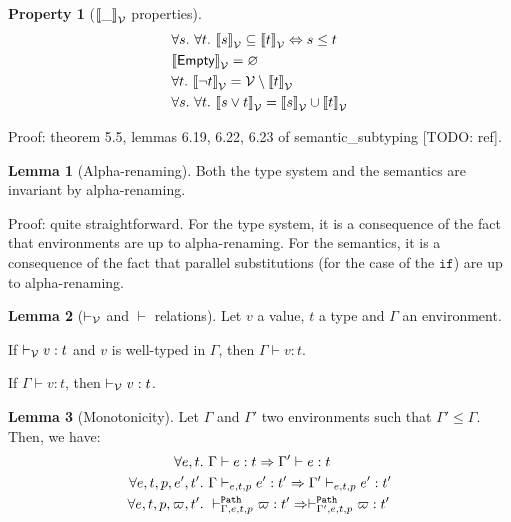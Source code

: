 \documentclass[a4paper]{article}
\theoremstyle{definition}
\newtheorem{lemma}{Lemma}
\newtheorem{property}{Property}
\begin{document}
        \begin{property}[$\valsemantic \_$ properties]
          \begin{align*}
            &\forall s.\ \forall t.\ \valsemantic s \subseteq \valsemantic t \Leftrightarrow s \leq t\\
            &\valsemantic \Empty = \varnothing\\
            &\forall t.\ \valsemantic {\neg t} = \values \setminus \valsemantic t\\
            &\forall s.\ \forall t.\ \valsemantic {s\vee t} = \valsemantic s \cup \valsemantic t
          \end{align*}
        \end{property}
        Proof: theorem 5.5, lemmas 6.19, 6.22, 6.23 of semantic_subtyping [TODO: ref].

        \begin{lemma}[Alpha-renaming]
          Both the type system and the semantics are invariant by alpha-renaming.
        \end{lemma}
        Proof: quite straightforward.
        For the type system, it is a consequence of the fact that environments are up to alpha-renaming.
        For the semantics, it is a consequence of the fact that parallel substitutions (for the case of the $\texttt{if}$)
        are up to alpha-renaming.

        \begin{lemma}[$\vvdash$ and $\vdash$ relations]Let $v$ a value, $t$ a type and $\Gamma$ an environment.

          If $\vvdash v:t$ and $v$ is well-typed in $\Gamma$, then $\Gamma\vdash v:t$.

          If $\Gamma \vdash v:t$, then $\vvdash v:t$.
        \end{lemma}
    
        \begin{lemma}[Monotonicity]
          Let $\Gamma$ and $\Gamma'$ two environments such that $\Gamma' \leq \Gamma$.
          Then, we have:
          \begin{align*}
            \forall e,t.\ &\Gamma \vdash e:t \Rightarrow \Gamma' \vdash e:t\\
            \forall e,t,p,e',t'.\ &\Gamma \cvdash p e t e':t' \Rightarrow \Gamma' \cvdash p e t e':t'\\
            \forall e,t,p,\varpi,t'.\ &\pvdash \Gamma p e t \varpi:t' \Rightarrow \pvdash {\Gamma'} p e t \varpi:t'
          \end{align*}
        \end{lemma}
\end{document}
